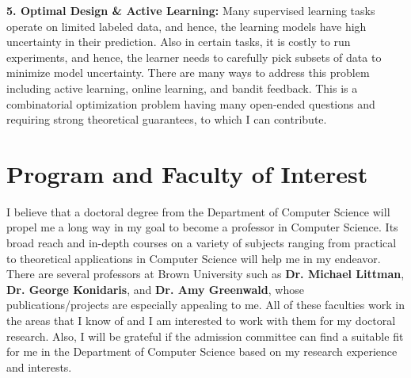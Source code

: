 \documentclass{article}
\begin{document}
\textbf{5. Optimal Design \& Active Learning:} Many supervised learning tasks operate on limited labeled data, and hence, the learning models have high uncertainty in their prediction. Also in certain tasks, it is costly to run experiments, and hence, the learner needs to carefully pick subsets of data to minimize model uncertainty. There are many ways to address this problem including active learning, online learning, and bandit feedback. This is a combinatorial optimization problem having many open-ended questions and requiring strong theoretical guarantees, to which I can contribute.

\vspace*{-2em}
\section{Program and Faculty of Interest}
\vspace*{-1em}

I believe that a doctoral degree from the Department of Computer Science will propel me a long way in my goal to become a professor in Computer Science. Its broad reach and in-depth courses on a  variety of subjects ranging from practical to theoretical applications in Computer Science will help me in my endeavor. There are several professors at Brown University such as \textbf{Dr. Michael Littman}, \textbf{Dr. George  Konidaris}, and \textbf{Dr. Amy Greenwald}, whose publications/projects are especially appealing to me. All of these faculties work in the areas that I know of and I am interested to work with them for my doctoral research. Also, I will be grateful if the admission committee can find a suitable fit for me in the Department of Computer Science based on my research experience and interests.




\vspace*{-2em}



\end{document}
